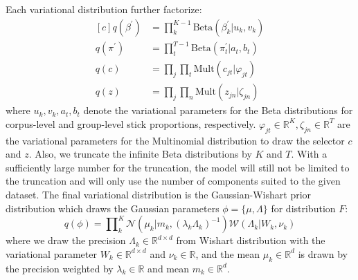 \documentclass{article}
\begin{document}
Each variational distribution further factorize:
\begin{equation}\label{eq:meanfield_further}
\begin{aligned}[c]
    q(\beta^{\prime}) &= \textstyle \prod\nolimits_{k}^{K-1}\text{Beta}(\beta^{\prime}_{k}|u_{k}, v_{k}) \\
    q(\pi^{\prime}) &= \textstyle \prod\nolimits_{t}^{T-1}\text{Beta}(\pi^{\prime}_{t}|a_{t}, b_{t}) \\
    q(c) &= \textstyle \prod\nolimits_{j}\prod\nolimits_{t}\text{Mult}(c_{jt}|\varphi_{jt}) \\
    q(z) &= \textstyle \prod\nolimits_{j}\prod\nolimits_{n}\text{Mult}(z_{jn}|\zeta_{jn})
\end{aligned}
\end{equation}
where $u_{k}, v_{k}, a_{t}, b_{t}$ denote the variational parameters for the Beta distributions for corpus-level and group-level stick proportions, respectively. $\varphi_{jt}\in\mathbb{R}^{K}, \zeta_{jn}\in\mathbb{R}^{T}$ are the variational parameters for the Multinomial distribution to draw the selector $c$ and $z$. Also, we truncate the infinite Beta distributions by $K$ and $T$. With a sufficiently large number for the truncation, the model will still not be limited to the truncation and will only use the number of components suited to the given dataset. The final variational distribution is the Gaussian-Wishart prior distribution which draws the Gaussian parameters $\phi = \{\mu, \Lambda\}$ for distribution $F$:
\begin{equation}\label{eq:meanfield_normalwishart}
    q(\phi) = \textstyle \prod\nolimits_{k}^{K}\mathcal{N}(\mu_{k}|m_{k}, (\lambda_{k}\Lambda_{k})^{-1})\mathcal{W}(\Lambda_{k}|W_{k}, \nu_{k})
\end{equation}
where we draw the precision $\Lambda_{k}\in\mathbb{R}^{d \times d}$ from Wishart distribution with the variational parameter $W_{k}\in\mathbb{R}^{d \times d}$ and $\nu_{k}\in\mathbb{R}$, and the mean $\mu_{k}\in\mathbb{R}^{d}$ is drawn by the precision weighted by $\lambda_{k}\in\mathbb{R}$ and mean $m_{k}\in\mathbb{R}^{d}$.
\end{document}
